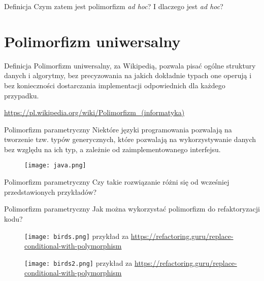 \begin{frame}{Definicja}
	Czym zatem jest polimorfizm \emph{ad hoc}? I dlaczego jest \emph{ad hoc}?
\end{frame}

\section{Polimorfizm uniwersalny}

\begin{frame}{Definicja}
	Polimorfizm uniwersalny, za Wikipedią, pozwala pisać ogólne struktury danych i algorytmy, bez precyzowania na jakich dokładnie typach one operują i bez konieczności dostarczania implementacji odpowiednich dla każdego przypadku. 
	
	\footnotesize{\url{https://pl.wikipedia.org/wiki/Polimorfizm_(informatyka)}}
\end{frame}

\begin{frame}{Polimorfizm parametryczny}
	Niektóre języki programowania pozwalają na tworzenie tzw. typów generycznych, które pozwalają na wykorzystywanie danych bez względu na ich typ, a zależnie od zaimplementowanego interfejsu.
\end{frame}

\begin{frame}
	\begin{figure} \centering
		\texttt{[image: java.png]}
	\end{figure}
\end{frame}

\begin{frame}{Polimorfizm parametryczny}
	Czy takie rozwiązanie różni się od wcześniej przedstawionych przykładów?
\end{frame}

\begin{frame}{Polimorfizm parametryczny}
	Jak można wykorzystać polimorfizm do refaktoryzacji kodu?
\end{frame}

\begin{frame}
	\begin{figure} \centering
		\texttt{[image: birds.png]}
		\footnotesize{przykład za \url{https://refactoring.guru/replace-conditional-with-polymorphism}}
	\end{figure}
\end{frame}

\begin{frame}
	\begin{figure} \centering
		\texttt{[image: birds2.png]}
		\footnotesize{przykład za \url{https://refactoring.guru/replace-conditional-with-polymorphism}}
	\end{figure}
\end{frame}

